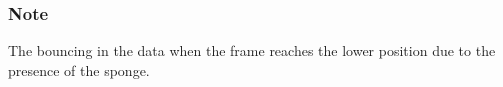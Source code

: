 %
%
%

\subsubsection{Note}
The bouncing in the data when the frame reaches the lower position due to the presence of the sponge.




